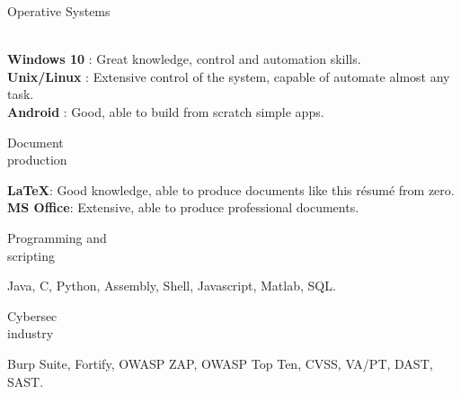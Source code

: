 \begin{minipage}{.3\textwidth}
	\flushright Operative Systems \\ \faWindows \ \faLinux \ \faApple \ \faAndroid
\end{minipage}
\hfill
\begin{minipage}{.65\textwidth}
	\vfill
	\textbf{Windows 10} \faWindows : Great knowledge, control and automation skills. 
	\\
	\textbf{Unix/Linux} \faLinux : Extensive control of the system, capable of automate almost any task.
	\\
	\textbf{Android} \faAndroid : Good, able to build from scratch simple apps.  
	\vfill
\end{minipage}

\bigskip

\begin{minipage}{.3\textwidth}
	\flushright Document \\ production \faBook 
\end{minipage}
\hfill
\begin{minipage}{.65\textwidth}
	\vfill
	\textbf{\LaTeX}: Good knowledge, able to produce documents like this résumé from zero.
	\\
	\textbf{MS Office}: Extensive, able to produce professional documents.
	\vfill
\end{minipage}

\bigskip

\begin{minipage}{.3\textwidth}
	\flushright Programming and \\ scripting \faTerminal
\end{minipage}
\hfill
\begin{minipage}{.65\textwidth}
	\vfill
	Java, C, Python, Assembly, Shell, Javascript, Matlab, SQL. 
	\vfill
\end{minipage}

\bigskip

\begin{minipage}{.3\textwidth}
	\flushright Cybersec \\ industry \faExpeditedssl
\end{minipage}
\hfill
\begin{minipage}{.64\textwidth}
	\vfill
	Burp Suite, Fortify, OWASP ZAP, OWASP Top Ten, CVSS, VA/PT, DAST, SAST.
	\vfill
\end{minipage}
